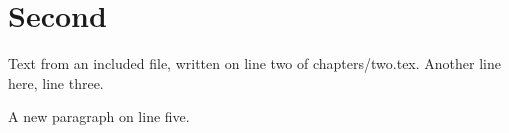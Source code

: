 \section{Second}
Text from an included file, written on line two of chapters/two.tex.
Another line here, line three.

A new paragraph on line five.
